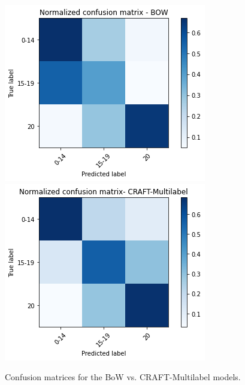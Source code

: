\documentclass{article}
\begin{document}
\begin{figure}[t]
  \centering
  \includegraphics[width=0.9\columnwidth]{figs/cm-bow.png}
  \includegraphics[width=0.9\columnwidth]{figs/cm-craftmulti.png}
  \caption{Confusion matrices for the BoW vs. CRAFT-Multilabel models.}
  \label{fig:confusion-matrices}
\end{figure}


\end{document}
